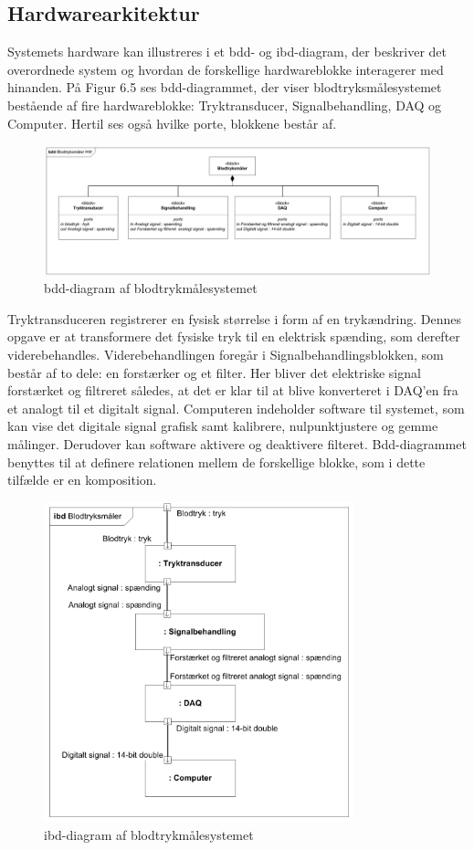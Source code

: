 \subsection{Hardwarearkitektur}
Systemets hardware kan illustreres i et bdd- og ibd-diagram, der beskriver det overordnede system og hvordan de forskellige hardwareblokke interagerer med hinanden. På Figur 6.5 ses bdd-diagrammet, der viser blodtryksmålesystemet bestående af fire hardwareblokke: Tryktransducer, Signalbehandling, DAQ og Computer. Hertil ses også hvilke porte, blokkene består af.
\begin{figure}[H]
	\centering
	\includegraphics[width=1\textwidth]{Figurer/Snip20151209_70}
	\caption{bdd-diagram af blodtrykmålesystemet}
\end{figure}
Tryktransduceren registrerer en fysisk størrelse i form af en trykændring. Dennes opgave er at transformere det fysiske tryk til en elektrisk spænding, som derefter viderebehandles. Viderebehandlingen foregår i Signalbehandlingsblokken, som består af to dele: en forstærker og et filter. Her bliver det elektriske signal forstærket og filtreret således, at det er klar til at blive konverteret i DAQ’en fra et analogt til et digitalt signal. Computeren indeholder software til systemet, som kan vise det digitale signal grafisk samt kalibrere, nulpunktjustere og gemme målinger. Derudover kan software aktivere og deaktivere filteret.  
Bdd-diagrammet benyttes til at definere relationen mellem de forskellige blokke, som i dette tilfælde er en komposition. 
\begin{figure}[H]
	\centering
	\includegraphics[width=0.8\textwidth]{Figurer/Snip20151209_72}
	\caption{ibd-diagram af blodtrykmålesystemet}
\end{figure}
